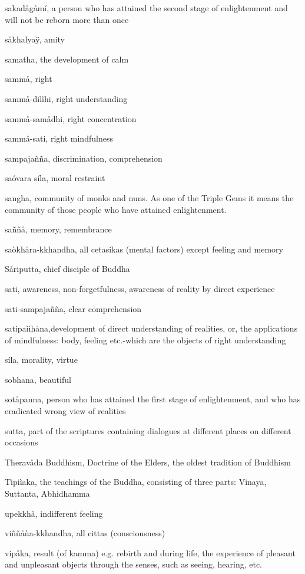 \documentclass[12pt,twoside]{article}
\begin{document}
sakad{\aa}g{\aa}m\'i, a person who has attained the second stage of
enlightenment and will not be reborn more than once

s{\aa}khalya\"y, amity

samatha, the development of calm

samm{\aa}, right

samm{\aa}{}-di\`i\`ihi, right understanding

samm{\aa}{}-sam{\aa}dhi, right concentration

samm{\aa}{}-sati, right mindfulness

sampaja\~n\~na, discrimination, comprehension

sa\'ovara s\'ila, moral restraint

sangha, community of monks and nuns. As one of the Triple Gems it means
the community of those people who have attained enlightenment.

sa\~n\~n{\aa}, memory, remembrance

sa\`okh{\aa}ra{}-kkhandha, all cetasikas (mental factors) except feeling
and memory

S{\aa}riputta, chief disciple of Buddha

sati, awareness, non{}-forgetfulness, awareness of reality by direct
experience

sati{}-sampaja\~n\~na, clear comprehension

satipa\`i\`ih{\aa}na,development of direct understanding of realities,
or, the applications of mindfulness: body, feeling etc.{}-which are the
objects of right understanding

s\'ila, morality, virtue

sobhana, beautiful

sot{\aa}panna, person who has attained the first stage of enlightenment,
and who has eradicated wrong view of realities

sutta, part of the scriptures containing dialogues at different places
on different occasions

Therav{\aa}da Buddhism, {\textasciigrave}Doctrine of the
Elders{\textquotesingle}, the oldest tradition of Buddhism

Tipi\`iaka, the teachings of the Buddha, consisting of three parts:
Vinaya, Suttanta, Abhidhamma

upekkh{\aa}, indifferent feeling

vi\~n\~n{\aa}\`ua{}-kkhandha, all cittas (consciousness)

vip{\aa}ka, result (of kamma) e.g. rebirth and during life, the
experience of pleasant and unpleasant objects through the senses, such
as seeing, hearing, etc.
\end{document}
